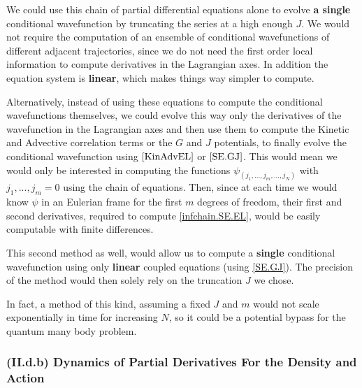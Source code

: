 \documentclass[11pt, a4paper]{article} %
\begin{document}
We could use this chain of partial differential equations alone to evolve {\bf a single} conditional wavefunction by truncating the series at a high enough $J$. We would not require the computation of an ensemble of conditional wavefunctions of different adjacent trajectories, since we do not need the first order local information to compute derivatives in the Lagrangian axes. In addition the equation system is {\bf linear}, which makes things way simpler to compute.

Alternatively, instead of using these equations to compute the conditional wavefunctions themselves, we could evolve this way only the derivatives of the wavefunction in the Lagrangian axes and then use them to compute the Kinetic and Advective correlation terms or the $G$ and $J$ potentials, to finally evolve the conditional wavefunction using $\eqref{KinAdvEL}$ or $\eqref{SE.GJ}$. This would mean we would only be interested in computing the functions $\psi_{(j_1,...,j_m,...,j_N)}$ with $j_1,...,j_m=0$ using the chain of equations. Then, since at each time we would know $\psi$ in an Eulerian frame for the first $m$ degrees of freedom, their first and second derivatives, required to compute \eqref{infchain.SE.EL}, would be easily computable with finite differences. 

This second method as well, would allow us to compute a {\bf single} conditional wavefunction using only {\bf linear} coupled equations (using \eqref{SE.GJ}). The precision of the method would then solely rely on the truncation $J$ we chose. 

In fact, a method of this kind, assuming a fixed $J$ and $m$ would not scale exponentially in time for increasing $N$, so it could be a potential bypass for the quantum many body problem.

\vspace{-0.1cm}

\subsubsection*{(II.d.b) Dynamics of Partial Derivatives For the Density and Action}\vspace{-0.1cm}
\end{document}
